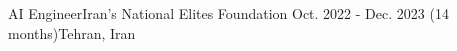 \resumeSubheadingReza
{AI Engineer}{Iran's National Elites Foundation}
{Oct. 2022 - Dec. 2023 (14 months)}{Tehran, Iran}
